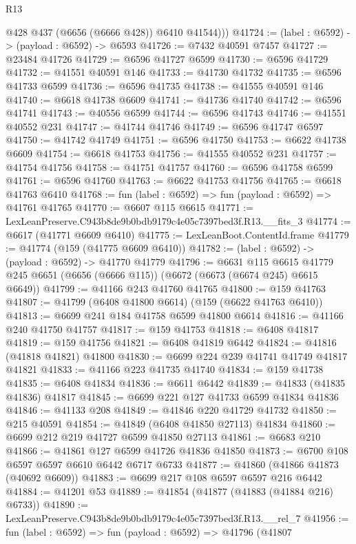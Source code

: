 \begin{lexlean}{R13}
\begin{coremodule}
          @428
          @437
          (@6656 (@6666 @428))
          @6410
          @41544)))
@41724 := (label : @6592) -> (payload : @6592) -> @6593
@41726 := @7432 @40591 @7457
@41727 := @23484 @41726
@41729 := @6596 @41727 @6599
@41730 := @6596 @41729
@41732 := @41551 @40591 @146
@41733 := @41730 @41732
@41735 := @6596 @41733 @6599
@41736 := @6596 @41735
@41738 := @41555 @40591 @146
@41740 := @6618 @41738 @6609
@41741 := @41736 @41740
@41742 := @6596 @41741
@41743 := @40556 @6599
@41744 := @6596 @41743
@41746 := @41551 @40552 @231
@41747 := @41744 @41746
@41749 := @6596 @41747 @6597
@41750 := @41742 @41749
@41751 := @6596 @41750
@41753 := @6622 @41738 @6609
@41754 := @6618 @41753
@41756 := @41555 @40552 @231
@41757 := @41754 @41756
@41758 := @41751 @41757
@41760 := @6596 @41758 @6599
@41761 := @6596 @41760
@41763 := @6622 @41753 @41756
@41765 := @6618 @41763 @6410
@41768 := fun (label : @6592) => fun (payload : @6592) => @41761 @41765
@41770 := @6607 @115 @6615
@41771 := LexLeanPreserve.C943b8de9b0bdb9179c4e05c7397bed3f.R13.__fits_3
@41774 := @6617 (@41771 @6609 @6410)
@41775 := LexLeanBoot.ContentId.frame
@41779 := @41774 (@159 (@41775 @6609 @6410))
@41782 := (label : @6592) -> (payload : @6592) -> @41770 @41779
@41796 := @6631
    @115
    @6615
    @41779
    @245
    @6651
    (@6656 (@6666 @115))
    (@6672 (@6673 (@6674 @245) @6615 @6649))
@41799 := @41166 @243 @41760 @41765
@41800 := @159 @41763
@41807 := @41799 (@6408 @41800 @6614) (@159 (@6622 @41763 @6410))
@41813 := @6699 @241 @184 @41758 @6599 @41800 @6614
@41816 := @41166 @240 @41750 @41757
@41817 := @159 @41753
@41818 := @6408 @41817
@41819 := @159 @41756
@41821 := @6408 @41819 @6442
@41824 := @41816 (@41818 @41821) @41800
@41830 := @6699 @224 @239 @41741 @41749 @41817 @41821
@41833 := @41166 @223 @41735 @41740
@41834 := @159 @41738
@41835 := @6408 @41834
@41836 := @6611 @6442
@41839 := @41833 (@41835 @41836) @41817
@41845 := @6699 @221 @127 @41733 @6599 @41834 @41836
@41846 := @41133 @208
@41849 := @41846 @220 @41729 @41732
@41850 := @215 @40591
@41854 := @41849 (@6408 @41850 @27113) @41834
@41860 := @6699 @212 @219 @41727 @6599 @41850 @27113
@41861 := @6683 @210
@41866 := @41861 @127 @6599 @41726 @41836 @41850
@41873 := @6700 @108 @6597 @6597 @6610 @6442 @6717 @6733
@41877 := @41860 (@41866 @41873 (@40692 @6609))
@41883 := @6699 @217 @108 @6597 @6597 @216 @6442
@41884 := @41201 @53
@41889 := @41854 (@41877 (@41883 (@41884 @216) @6733))
@41890 := LexLeanPreserve.C943b8de9b0bdb9179c4e05c7397bed3f.R13.__rel_7
@41956 := fun (label : @6592) =>
  fun (payload : @6592) =>
  @41796
    (@41807

\end{coremodule}
\end{lexlean}
